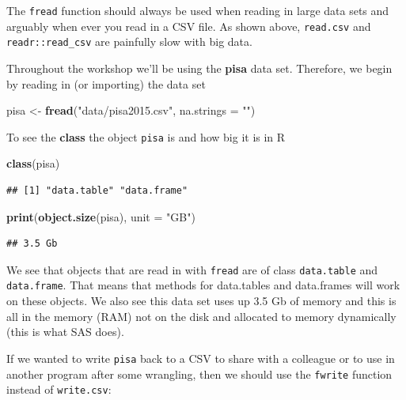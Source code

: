\documentclass[]{book}
\newenvironment{Shaded}{\begin{snugshade}}{\end{snugshade}}
\newcommand{\DataTypeTok}[1]{\textcolor[rgb]{0.13,0.29,0.53}{#1}}
\newcommand{\KeywordTok}[1]{\textcolor[rgb]{0.13,0.29,0.53}{\textbf{#1}}}
\newcommand{\NormalTok}[1]{#1}
\newcommand{\StringTok}[1]{\textcolor[rgb]{0.31,0.60,0.02}{#1}}
\begin{document}
The \texttt{fread} function should always be used when reading in large data sets and arguably when ever you read in a CSV file. As shown above, \texttt{read.csv} and \texttt{readr::read\_csv} are painfully slow with big data.

Throughout the workshop we'll be using the \textbf{pisa} data set. Therefore, we begin by reading in (or importing) the data set

\begin{Shaded}
\begin{Highlighting}[]
\NormalTok{pisa <-}\StringTok{ }\KeywordTok{fread}\NormalTok{(}\StringTok{"data/pisa2015.csv"}\NormalTok{, }\DataTypeTok{na.strings =} \StringTok{""}\NormalTok{)}
\end{Highlighting}
\end{Shaded}

To see the \textbf{class} the object \texttt{pisa} is and how big it is in R

\begin{Shaded}
\begin{Highlighting}[]
\KeywordTok{class}\NormalTok{(pisa)}
\end{Highlighting}
\end{Shaded}

\begin{verbatim}
## [1] "data.table" "data.frame"
\end{verbatim}

\begin{Shaded}
\begin{Highlighting}[]
\KeywordTok{print}\NormalTok{(}\KeywordTok{object.size}\NormalTok{(pisa), }\DataTypeTok{unit =} \StringTok{"GB"}\NormalTok{)}
\end{Highlighting}
\end{Shaded}

\begin{verbatim}
## 3.5 Gb
\end{verbatim}

We see that objects that are read in with \texttt{fread} are of class \texttt{data.table} and \texttt{data.frame}. That means that methods for data.tables and data.frames will work on these objects. We also see this data set uses up 3.5 Gb of memory and this is all in the memory (RAM) not on the disk and allocated to memory dynamically (this is what SAS does).

If we wanted to write \texttt{pisa} back to a CSV to share with a colleague or to use in another program after some wrangling, then we should use the \texttt{fwrite} function instead of \texttt{write.csv}:
\end{document}
